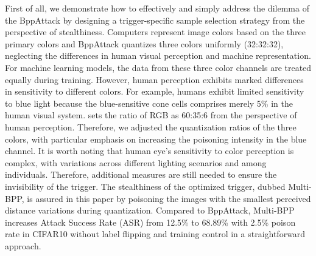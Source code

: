 \documentclass{article}
\begin{document}
First of all, we demonstrate how to effectively and simply address the dilemma of the BppAttack by designing a trigger-specific sample selection strategy from the perspective of stealthiness. Computers represent image colors based on the three primary colors and BppAttack quantizes three colors uniformly (32:32:32), neglecting the differences in human visual perception and machine representation. For machine learning models, the data from these three color channels are treated equally during training. However, human perception exhibits marked differences in sensitivity to different colors. For example, humans exhibit limited sensitivity to blue light because the blue-sensitive cone cells comprises merely 5\% in the human visual system. \citet{land1971lightness} sets the ratio of RGB as 60:35:6 from the perspective of human perception. Therefore, we adjusted the quantization ratios of the three colors, with particular emphasis on increasing the poisoning intensity in the blue channel. It is worth noting that human eye's sensitivity to color perception is complex, with variations across different lighting scenarios and among individuals. Therefore, additional measures are still needed to ensure the invisibility of the trigger. The stealthiness of the optimized trigger, dubbed Multi-BPP, is assured in this paper by poisoning the images with the smallest perceived distance variations during quantization. Compared to BppAttack, Multi-BPP increases Attack Success Rate (ASR) from 12.5\% to 68.89\% with 2.5\% poison rate in CIFAR10 without label flipping and training control in a straightforward approach.
\end{document}

